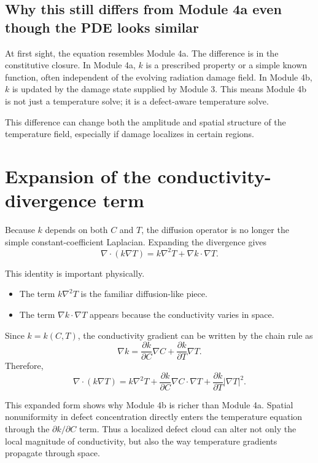 \documentclass[11pt]{article}
\newcommand{\absval}[1]{\left\lvert #1 \right\rvert}
\begin{document}
\subsection{Why this still differs from Module 4a even though the PDE looks similar}

At first sight, the equation resembles Module 4a. The difference is in the constitutive closure. In Module 4a, $k$ is a prescribed property or a simple known function, often independent of the evolving radiation damage field. In Module 4b, $k$ is updated by the damage state supplied by Module 3. This means Module 4b is not just a temperature solve; it is a defect-aware temperature solve.

This difference can change both the amplitude and spatial structure of the temperature field, especially if damage localizes in certain regions.

\section{Expansion of the conductivity-divergence term}

Because $k$ depends on both $C$ and $T$, the diffusion operator is no longer the simple constant-coefficient Laplacian. Expanding the divergence gives
\[
\nabla\cdot\left(k\nabla T\right) = k\nabla^2 T + \nabla k \cdot \nabla T.
\]

This identity is important physically.

\begin{itemize}
    \item The term $k\nabla^2 T$ is the familiar diffusion-like piece.
    \item The term $\nabla k \cdot \nabla T$ appears because the conductivity varies in space.
\end{itemize}

Since $k=k(C,T)$, the conductivity gradient can be written by the chain rule as
\[
\nabla k = \frac{\partial k}{\partial C}\nabla C + \frac{\partial k}{\partial T}\nabla T.
\]
Therefore,
\[
\nabla\cdot\left(k\nabla T\right) = k\nabla^2 T + \frac{\partial k}{\partial C}\nabla C\cdot\nabla T + \frac{\partial k}{\partial T}\absval{\nabla T}^2.
\]

This expanded form shows why Module 4b is richer than Module 4a. Spatial nonuniformity in defect concentration directly enters the temperature equation through the $\partial k/\partial C$ term. Thus a localized defect cloud can alter not only the local magnitude of conductivity, but also the way temperature gradients propagate through space.
\end{document}

